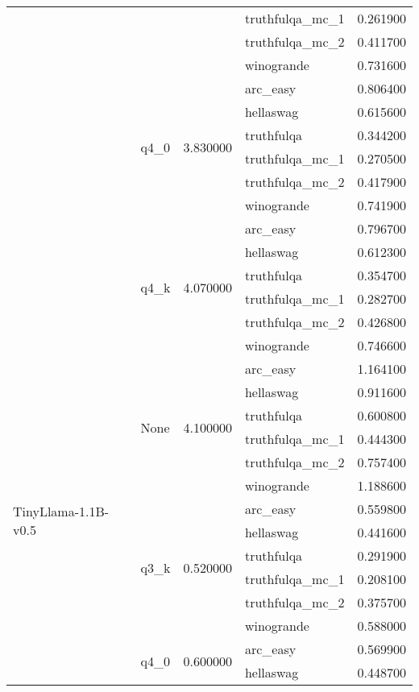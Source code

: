 \begin{tabular}{lllll}
 &  &  & truthfulqa\_mc\_1 & 0.261900 \\
 &  &  & truthfulqa\_mc\_2 & 0.411700 \\
 &  &  & winogrande & 0.731600 \\
\cline{2-5} \cline{3-5}
 & \multirow[t]{6}{*}{q4\_0} & \multirow[t]{6}{*}{3.830000} & arc\_easy & 0.806400 \\
 &  &  & hellaswag & 0.615600 \\
 &  &  & truthfulqa & 0.344200 \\
 &  &  & truthfulqa\_mc\_1 & 0.270500 \\
 &  &  & truthfulqa\_mc\_2 & 0.417900 \\
 &  &  & winogrande & 0.741900 \\
\cline{2-5} \cline{3-5}
 & \multirow[t]{6}{*}{q4\_k} & \multirow[t]{6}{*}{4.070000} & arc\_easy & 0.796700 \\
 &  &  & hellaswag & 0.612300 \\
 &  &  & truthfulqa & 0.354700 \\
 &  &  & truthfulqa\_mc\_1 & 0.282700 \\
 &  &  & truthfulqa\_mc\_2 & 0.426800 \\
 &  &  & winogrande & 0.746600 \\
\cline{1-5} \cline{2-5} \cline{3-5}
\multirow[t]{24}{*}{TinyLlama-1.1B-v0.5} & \multirow[t]{6}{*}{None} & \multirow[t]{6}{*}{4.100000} & arc\_easy & 1.164100 \\
 &  &  & hellaswag & 0.911600 \\
 &  &  & truthfulqa & 0.600800 \\
 &  &  & truthfulqa\_mc\_1 & 0.444300 \\
 &  &  & truthfulqa\_mc\_2 & 0.757400 \\
 &  &  & winogrande & 1.188600 \\
\cline{2-5} \cline{3-5}
 & \multirow[t]{6}{*}{q3\_k} & \multirow[t]{6}{*}{0.520000} & arc\_easy & 0.559800 \\
 &  &  & hellaswag & 0.441600 \\
 &  &  & truthfulqa & 0.291900 \\
 &  &  & truthfulqa\_mc\_1 & 0.208100 \\
 &  &  & truthfulqa\_mc\_2 & 0.375700 \\
 &  &  & winogrande & 0.588000 \\
\cline{2-5} \cline{3-5}
 & \multirow[t]{6}{*}{q4\_0} & \multirow[t]{6}{*}{0.600000} & arc\_easy & 0.569900 \\
 &  &  & hellaswag & 0.448700 \\

\end{tabular}
